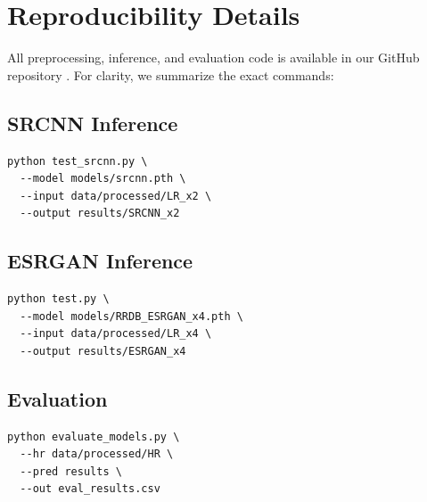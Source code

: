 \documentclass[]{spie}
\begin{document}



\appendix
\section{Reproducibility Details}
All preprocessing, inference, and evaluation code is available in our GitHub repository \cite{github_repo}. For clarity, we summarize the exact commands:

\subsection{SRCNN Inference}
\begin{verbatim}
python test_srcnn.py \
  --model models/srcnn.pth \
  --input data/processed/LR_x2 \
  --output results/SRCNN_x2
\end{verbatim}

\subsection{ESRGAN Inference}
\begin{verbatim}
python test.py \
  --model models/RRDB_ESRGAN_x4.pth \
  --input data/processed/LR_x4 \
  --output results/ESRGAN_x4
\end{verbatim}

\subsection{Evaluation}
\begin{verbatim}
python evaluate_models.py \
  --hr data/processed/HR \
  --pred results \
  --out eval_results.csv
  
\end{verbatim}
\end{document}
